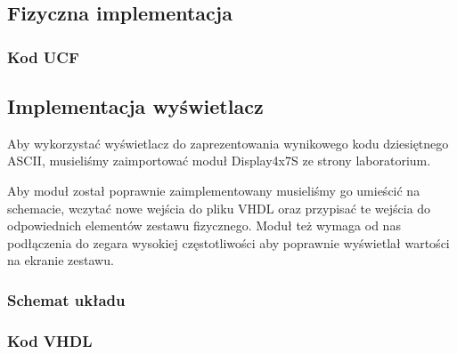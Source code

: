 \documentclass[a4paper,12pt]{extarticle}  %
\begin{document}
\subsection{Fizyczna implementacja}
\subsubsection{Kod UCF}

\subsection{Implementacja wyświetlacz}
Aby wykorzystać wyświetlacz do zaprezentowania wynikowego kodu dziesiętnego ASCII, musieliśmy zaimportować moduł Display4x7S ze strony laboratorium.

Aby moduł został poprawnie zaimplementowany musieliśmy go umieścić na schemacie, wczytać nowe wejścia do pliku VHDL oraz przypisać te wejścia do odpowiednich elementów zestawu fizycznego.
Moduł też wymaga od nas podłączenia do zegara wysokiej częstotliwości aby poprawnie wyświetlał wartości na ekranie zestawu.
\subsubsection{Schemat układu}
\begin{figure}[H]
	\centering
\end{figure}
\subsubsection{Kod VHDL}

\end{document}

